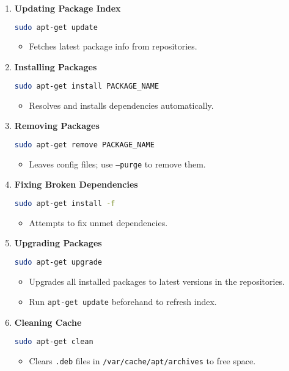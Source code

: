 \documentclass[a4paper]{report}
\begin{document}
\begin{enumerate}
    \item \textbf{Updating Package Index}
    \begin{lstlisting}[language=bash]
sudo apt-get update
    \end{lstlisting}
    \begin{itemize}
        \item Fetches latest package info from repositories.
    \end{itemize}

    \item \textbf{Installing Packages}
    \begin{lstlisting}[language=bash]
sudo apt-get install PACKAGE_NAME
    \end{lstlisting}
    \begin{itemize}
        \item Resolves and installs dependencies automatically.
    \end{itemize}

    \item \textbf{Removing Packages}
    \begin{lstlisting}[language=bash]
sudo apt-get remove PACKAGE_NAME
    \end{lstlisting}
    \begin{itemize}
        \item Leaves config files; use \texttt{--purge} to remove them.
    \end{itemize}

    \item \textbf{Fixing Broken Dependencies}
    \begin{lstlisting}[language=bash]
sudo apt-get install -f
    \end{lstlisting}
    \begin{itemize}
        \item Attempts to fix unmet dependencies.
    \end{itemize}

    \item \textbf{Upgrading Packages}
    \begin{lstlisting}[language=bash]
sudo apt-get upgrade
    \end{lstlisting}
    \begin{itemize}
        \item Upgrades all installed packages to latest versions in the repositories.
        \item Run \texttt{apt-get update} beforehand to refresh index.
    \end{itemize}

    \item \textbf{Cleaning Cache}
    \begin{lstlisting}[language=bash]
sudo apt-get clean
    \end{lstlisting}
    \begin{itemize}
        \item Clears \texttt{.deb} files in \texttt{/var/cache/apt/archives} to free space.
    \end{itemize}
\end{enumerate}
\end{document}
